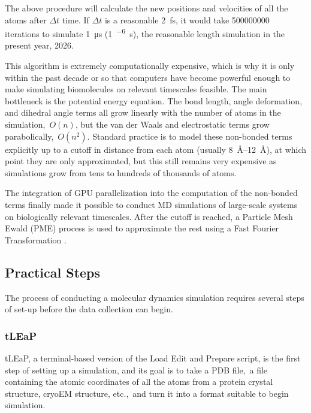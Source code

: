 The above procedure will calculate the new positions and velocities of all the atoms after \(\Delta t\) time. If \(\Delta t \) is a reasonable \qty{2}{\femto\second}, it would take \num{500000000} iterations to simulate \qty{1}{\micro\second} (\qty{1}{^{-6}\second}), the reasonable length simulation in the present year, 2026.

This algorithm is extremely computationally expensive, which is why it is only within the past decade or so that computers have become powerful enough to make simulating biomolecules on relevant timescales feasible. The main bottleneck is the potential energy equation. The bond length, angle deformation, and dihedral angle terms all grow linearly with the number of atoms in the simulation, \(O(n)\), but the van der Waals and electrostatic terms grow parabolically, \(O(n^{2})\). Standard practice is to model these non-bonded terms explicitly up to a cutoff in distance from each atom (usually \qtyrange{8}{12}{\angstrom}), at which point they are only approximated, but this still remains very expensive as simulations grow from tens to hundreds of thousands of atoms.

The integration of GPU parallelization into the computation of the non-bonded terms finally made it possible to conduct MD simulations of large-scale systems on biologically relevant timescales. After the cutoff is reached, a Particle Mesh Ewald (PME) process is used to approximate the rest using a Fast Fourier Transformation \parencite{salomon2013routine}.

\subsection{Practical Steps}

The process of conducting a molecular dynamics simulation requires several steps of set-up before the data collection can begin.

\subsubsection{tLEaP}

tLEaP, a terminal-based version of the Load Edit and Prepare script, is the first step of setting up a simulation, and its goal is to take a PDB file, a file containing the atomic coordinates of all the atoms from a protein crystal structure, cryoEM structure, etc., and turn it into a format suitable to begin simulation.


